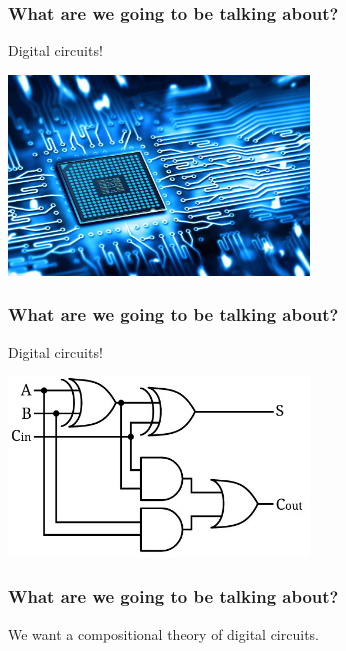 \begin{frame}
    \frametitle{What are we going to be talking about?}
    \pause
    \centering
    \LARGE
    Digital circuits!

    \includegraphics[width=0.6\textwidth]{imgs/circuit}
\end{frame}
\begin{frame}
    \frametitle{What are we going to be talking about?}
    \centering
    \LARGE
    Digital circuits!

    \includegraphics[width=0.6\textwidth]{imgs/adder}
\end{frame}
\begin{frame}
    \frametitle{What are we going to be talking about?}

    \pause

    \centering
    \LARGE
    We want a \alert{compositional} theory of digital circuits.

    \vspace{0.5em}

    \normalsize

    \pause
    
    \pause
    \quad
    
    \pause
    \quad
    


    \pause
    \vspace{1em}

    \raisebox{2em}{}
    \quad
    
    \quad
    \raisebox{2em}{}

\end{frame}
